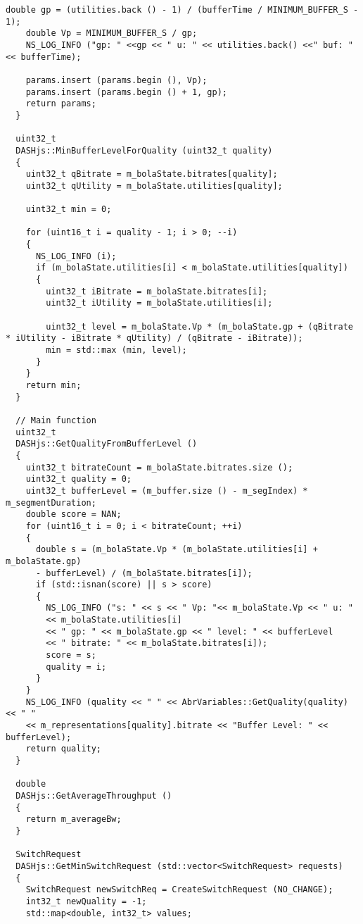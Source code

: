 \begin{lstlisting}[language=myC++, caption={DASHjs.cc}, captionpos=b]
    double gp = (utilities.back () - 1) / (bufferTime / MINIMUM_BUFFER_S - 1);
    double Vp = MINIMUM_BUFFER_S / gp;
    NS_LOG_INFO ("gp: " <<gp << " u: " << utilities.back() <<" buf: "<< bufferTime);
  
    params.insert (params.begin (), Vp);
    params.insert (params.begin () + 1, gp);
    return params;
  }
  
  uint32_t
  DASHjs::MinBufferLevelForQuality (uint32_t quality)
  {
    uint32_t qBitrate = m_bolaState.bitrates[quality];
    uint32_t qUtility = m_bolaState.utilities[quality];
  
    uint32_t min = 0;
  
    for (uint16_t i = quality - 1; i > 0; --i)
    {
      NS_LOG_INFO (i);
      if (m_bolaState.utilities[i] < m_bolaState.utilities[quality])
      {
        uint32_t iBitrate = m_bolaState.bitrates[i];
        uint32_t iUtility = m_bolaState.utilities[i];
  
        uint32_t level = m_bolaState.Vp * (m_bolaState.gp + (qBitrate * iUtility - iBitrate * qUtility) / (qBitrate - iBitrate));
        min = std::max (min, level);
      }
    }
    return min;
  }
  
  // Main function
  uint32_t
  DASHjs::GetQualityFromBufferLevel ()
  {
    uint32_t bitrateCount = m_bolaState.bitrates.size ();
    uint32_t quality = 0;
    uint32_t bufferLevel = (m_buffer.size () - m_segIndex) * m_segmentDuration;
    double score = NAN;
    for (uint16_t i = 0; i < bitrateCount; ++i)
    {
      double s = (m_bolaState.Vp * (m_bolaState.utilities[i] + m_bolaState.gp)
      - bufferLevel) / (m_bolaState.bitrates[i]);
      if (std::isnan(score) || s > score)
      {
        NS_LOG_INFO ("s: " << s << " Vp: "<< m_bolaState.Vp << " u: "
        << m_bolaState.utilities[i]
        << " gp: " << m_bolaState.gp << " level: " << bufferLevel
        << " bitrate: " << m_bolaState.bitrates[i]);
        score = s;
        quality = i;
      }
    }
    NS_LOG_INFO (quality << " " << AbrVariables::GetQuality(quality) << " "
    << m_representations[quality].bitrate << "Buffer Level: " << bufferLevel);
    return quality;
  }
  
  double
  DASHjs::GetAverageThroughput ()
  {
    return m_averageBw;
  }

  SwitchRequest
  DASHjs::GetMinSwitchRequest (std::vector<SwitchRequest> requests)
  {
    SwitchRequest newSwitchReq = CreateSwitchRequest (NO_CHANGE);
    int32_t newQuality = -1;
    std::map<double, int32_t> values;
  

\end{lstlisting}

